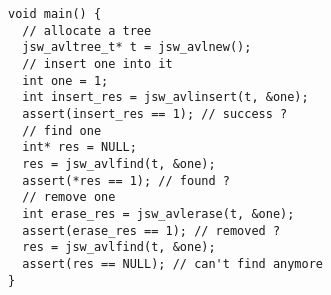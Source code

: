 \begin{verbatim}
void main() {
  // allocate a tree
  jsw_avltree_t* t = jsw_avlnew();
  // insert one into it
  int one = 1;
  int insert_res = jsw_avlinsert(t, &one);
  assert(insert_res == 1); // success ?
  // find one
  int* res = NULL;
  res = jsw_avlfind(t, &one);
  assert(*res == 1); // found ?
  // remove one
  int erase_res = jsw_avlerase(t, &one);
  assert(erase_res == 1); // removed ?
  res = jsw_avlfind(t, &one);
  assert(res == NULL); // can't find anymore
}
\end{verbatim}
